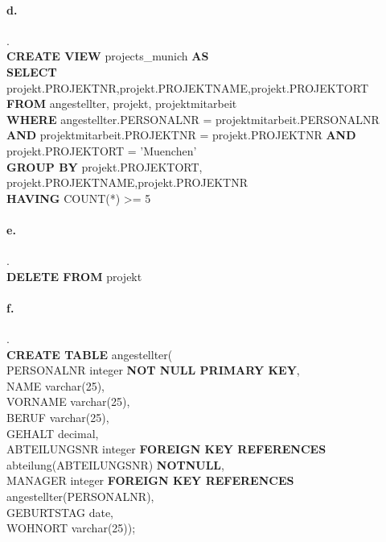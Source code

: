 \documentclass{article}
\begin{document}
		
		\paragraph*{d.}.\\
			\textbf{CREATE VIEW}  projects\_munich \textbf{AS}\\
			\textbf{SELECT} projekt.PROJEKTNR,projekt.PROJEKTNAME,projekt.PROJEKTORT\\
			\textbf{FROM} angestellter, projekt, projektmitarbeit\\
			\textbf{WHERE} angestellter.PERSONALNR = projektmitarbeit.PERSONALNR \textbf{AND} projektmitarbeit.PROJEKTNR = projekt.PROJEKTNR \textbf{AND} projekt.PROJEKTORT = 'Muenchen'\\
			\textbf{GROUP BY} projekt.PROJEKTORT, projekt.PROJEKTNAME,projekt.PROJEKTNR\\
			\textbf{HAVING} COUNT(*) >= 5
			
		\paragraph*{e.}.\\
			\textbf{DELETE FROM} projekt
		
		\pagebreak
			
		\paragraph*{f.}.\\
			\textbf{CREATE TABLE} angestellter(\\
			
				PERSONALNR integer \textbf{NOT NULL PRIMARY KEY},\\
				
				NAME varchar(25),\\
				
				VORNAME varchar(25),\\
				
				BERUF varchar(25),\\
				
				GEHALT decimal,\\
				
				ABTEILUNGSNR integer \textbf{FOREIGN KEY REFERENCES} abteilung(ABTEILUNGSNR) \textbf{NOTNULL},\\
				
				MANAGER integer \textbf{FOREIGN KEY REFERENCES} angestellter(PERSONALNR),\\
				
				GEBURTSTAG date,\\
				
				WOHNORT varchar(25));
			
			
\end{document}
